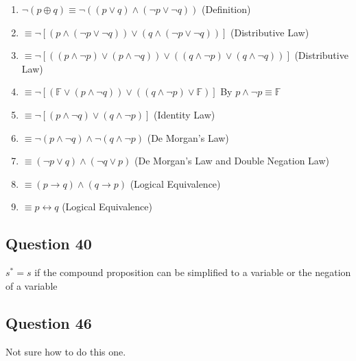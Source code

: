 \documentclass[12pt]{article}
\begin{document}
\begin{enumerate}
  \item $\neg (p \oplus q) \equiv \neg ((p \lor q) \land (\neg p \lor \neg q))$ (Definition)
  \item $\equiv \neg [(p \land (\neg p \lor \neg q)) \lor (q \land (\neg p \lor \neg q))]$ (Distributive Law)
  \item $\equiv \neg [((p \land \neg p) \lor (p \land \neg q)) \lor ((q \land \neg p) \lor (q \land \neg q))]$ (Distributive Law)
  \item $\equiv \neg [(\mathbb{F} \lor (p \land \neg q)) \lor ((q \land \neg p) \lor \mathbb{F})]$ By $p \land \neg p \equiv \mathbb{F}$
  \item $\equiv \neg [(p \land \neg q) \lor (q \land \neg p)]$ (Identity Law)
  \item $\equiv \neg (p \land \neg q) \land \neg (q \land \neg p)$ (De Morgan's Law)
  \item $\equiv (\neg p \lor q) \land (\neg q \lor p)$ (De Morgan's Law and Double Negation Law)
  \item $\equiv (p \to q) \land (q \to p)$ (Logical Equivalence)
  \item $\equiv p \leftrightarrow q$ (Logical Equivalence)
\end{enumerate}

\subsection*{Question 40}

$s^* = s$ if the compound proposition can be simplified to a variable or the
negation of a variable

\subsection*{Question 46}

Not sure how to do this one.
\end{document}
